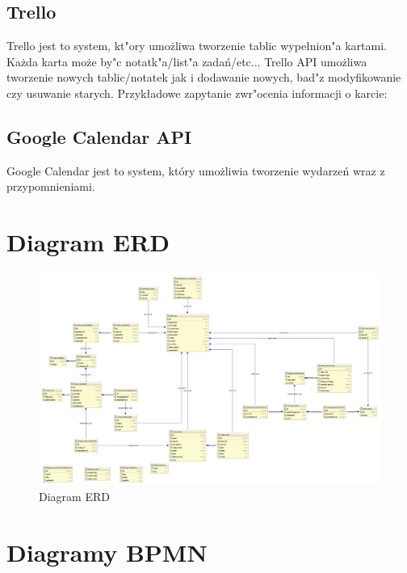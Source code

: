 \documentclass{article}
\begin{document}
\subsection{Trello}
Trello jest to system, kt"ory umo\.zliwa tworzenie tablic wypełnion"a kartami. Ka\.zda karta mo\.ze by"c notatk"a/list"a zadań/etc... Trello API umo\.zliwa tworzenie nowych tablic/notatek jak i dodawanie nowych, bad"z modyfikowanie czy usuwanie starych. Przykładowe zapytanie zwr"ocenia informacji o karcie:

\subsection{Google Calendar API}
Google Calendar jest to system, który umożliwia tworzenie wydarzeń wraz z przypomnieniami.

\section{Diagram ERD}

\begin{landscape}
\begin{figure}[!ht]
  \centering
    \includegraphics[width=1.5\textwidth]{erd}\par\vspace{1cm}
  \caption{Diagram ERD}
\end{figure}
\end{landscape}

\section{Diagramy BPMN}
\end{document}
